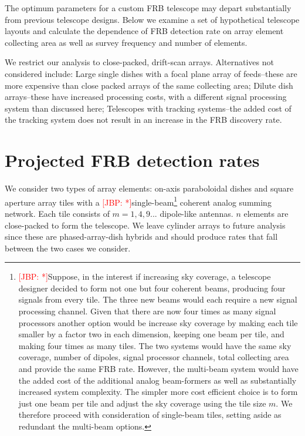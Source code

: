 \documentclass[fleqn,usenatbib]{mnras}
\newcommand{\kibitz}[2]{\ifnum\Comments=1\textcolor{#1}{#2}\fi}
\newcommand{\jbp}[1]{\kibitz{red}      {[JBP: #1]}}
\begin{document}
The optimum parameters for a custom FRB telescope may depart substantially from previous telescope designs.  Below we examine a set of hypothetical telescope layouts and calculate the dependence of FRB detection rate on array element collecting area as well as survey frequency and number of elements. 

We restrict our analysis to close-packed, drift-scan arrays. Alternatives not considered include: Large single dishes with a focal plane array of feeds--these are more expensive than close packed arrays of the same collecting area; Dilute dish arrays--these have increased processing costs, with a different signal processing system than discussed here; Telescopes with tracking systems--the added cost of the tracking system does not result in an increase in the FRB discovery rate.
 
\section{Projected FRB detection rates}

We consider two types of array elements: on-axis paraboloidal dishes and square aperture array tiles with a \jbp{*}single-beam\footnote{\jbp{*}Suppose, in the interest if increasing sky coverage, a telescope designer decided to form not one but four coherent beams, producing four signals from every tile. The three new beams would each require a new signal processing channel. Given that there are now four times as many signal processors another option would be increase sky coverage by making each tile smaller by a factor two in each dimension, keeping one beam per tile, and making four times as many tiles.  The two systems would have the same sky coverage, number of dipoles, signal processor channels, total collecting area and provide the same FRB rate. However, the multi-beam system would have the added cost of the additional analog beam-formers as well as substantially increased system complexity. The simpler more cost efficient choice is to form just one beam per tile and adjust the sky coverage using the tile size $m$. We therefore proceed with consideration of single-beam tiles, setting aside as redundant the multi-beam options.} coherent analog summing network.  Each tile consists of $m=1, 4, 9 ...$ dipole-like antennas. $n$ elements are close-packed to form the telescope.  
We leave cylinder arrays \citep{chimesystem} to future analysis since these are phased-array-dish hybrids and should produce rates that fall between the two cases we consider.
\end{document}
